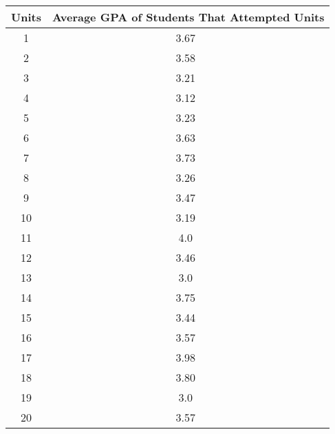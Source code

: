 \begin{center}
\begin{tabular}{|c|c|}
\hline
Units & Average GPA of Students That Attempted Units \\ \hline
1     & 3.67\                                      \\ \hline
2     & 3.58\                                       \\ \hline
3     & 3.21\                                      \\ \hline
4     & 3.12\                                     \\ \hline
5     & 3.23\                                      \\ \hline
6     & 3.63\                                      \\ \hline
7     & 3.73\                                      \\ \hline
8     & 3.26\                                      \\ \hline
9     & 3.47\                                      \\ \hline
10    & 3.19\                                      \\ \hline
11    & 4.0\                                      \\ \hline
12    & 3.46\                                      \\ \hline
13    & 3.0\                                      \\ \hline
14    & 3.75\                                      \\ \hline
15    & 3.44\                                      \\ \hline
16    & 3.57\                                      \\ \hline
17    & 3.98\                                      \\ \hline
18    & 3.80\                                      \\ \hline
19    & 3.0\                                      \\ \hline
20    & 3.57\                                       \\ \hline
\end{tabular}
\end{center}
